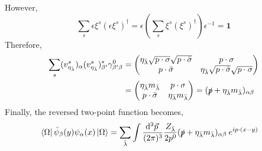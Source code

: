\documentclass[12pt]{article}
\begin{document}
However,
\[ \sum_{s} \epsilon \xi^s (\epsilon \xi^s)^\dagger = \epsilon \left( \sum_{s} \xi^s (\xi^s)^\dagger \right) \epsilon^{-1} = \mathbf{1} \]
Therefore,
\begin{align*} 
\sum_{s} (v^s_{\eta_{\bar{\lambda}}})_{\alpha} (v^s_{\eta_{\bar{\lambda}}})_{\beta'}^* \gamma^0_{\beta' \beta} & =
\begin{pmatrix}
\eta_{\bar{\lambda}} \sqrt{p \cdot \sigma} \sqrt{p \cdot \bar{\sigma}} & p \cdot \sigma 
\\
p \cdot \bar{\sigma} & \eta_{\bar{\lambda}} \sqrt{p \cdot \bar{\sigma}} \sqrt{p \cdot \sigma} 
\end{pmatrix}
\\
& =
\begin{pmatrix}
\eta_{\bar{\lambda}} m_{\bar{\lambda}}  & p \cdot \sigma 
\\
p \cdot \bar{\sigma} & \eta_{\bar{\lambda}} m_{\bar{\lambda}}
\end{pmatrix}
= (\slashed{p} + \eta_{\bar{\lambda}} m_{\bar{\lambda}})_{\alpha \beta}
\end{align*}
Finally, the reversed two-point function becomes,
\begin{align*}
\left< \Omega \right| \bar{\psi}_{\beta}(y) \psi_{\alpha}(x) \left| \Omega \right> & = \sum_{\bar{\lambda}} \int \frac{\mathrm{d}^{3} \vec{p} \:}{(2 \pi)^3} \frac{Z_{{\bar{\lambda}}}}{2 p^0} (\slashed{p} + \eta_{\bar{\lambda}} m_{\bar{\lambda}})_{\alpha \beta} \: e^{i p \cdot (x - y) }
\end{align*}
\end{document}
